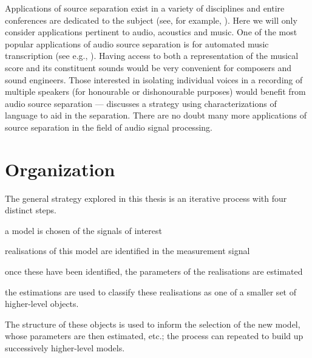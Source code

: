 Applications of source separation exist in a variety of disciplines and entire
conferences are dedicated to the subject (see, for example,
\cite{zarzoso2010latent}).  Here we will only consider applications pertinent to
audio, acoustics and music. One of the most popular applications of audio source
separation is for automated music transcription (see e.g.,
\cite{bertin2010enforcing}). Having access to both a representation of the
musical score and its constituent sounds would be very convenient for composers
and sound engineers. Those interested in isolating individual voices in a
recording of multiple speakers (for honourable or dishonourable purposes) would
benefit from audio source separation --- \cite{mysore2012non} discusses a
strategy using characterizations of language to aid in the separation. There are
no doubt many more applications of source separation in the field of audio
signal processing.

\section{Organization}

The general strategy explored in this thesis is an iterative process with four
distinct steps.
\begin{enumerate*}[label=(\arabic*),itemjoin={{. }}]
\item a model is chosen of the signals of interest
\item realisations of this model are
identified in the measurement signal
\item once these have been identified, the parameters
of the realisations are estimated
\item the estimations are used to classify these
realisations as one of a smaller set of higher-level objects.
\end{enumerate*}
The structure of these objects is used to inform the selection of the new model,
whose parameters are then estimated, etc.; the process can repeated to build
up successively higher-level models.

